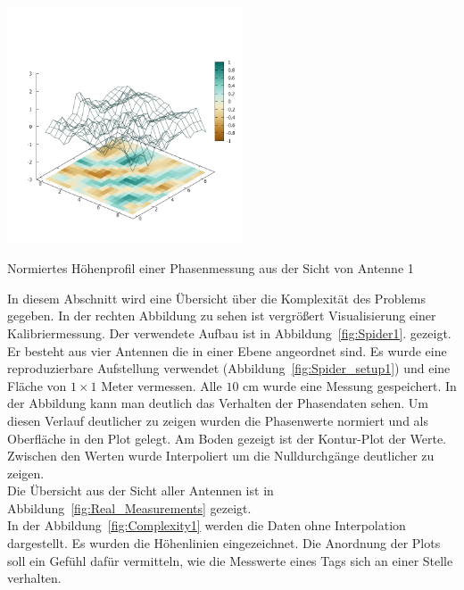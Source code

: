%
\begin{floatingfigure}[hr!]{6cm}
 \centering
         \includegraphics[width=7cm]{img/Plate0_A1.png}
         \caption[Profil einer Phasenmessung]{Normiertes Höhenprofil einer Phasenmessung aus der Sicht von Antenne 1 }
         \label{fig:Plate0_A1_}
\end{floatingfigure}
%
In diesem Abschnitt wird eine Übersicht über die Komplexität des Problems gegeben. In der rechten Abbildung zu sehen ist vergrößert Visualisierung einer Kalibriermessung. Der verwendete Aufbau ist in Abbildung~\ref{fig:Spider1}. gezeigt. Er besteht aus vier Antennen die in einer Ebene angeordnet sind. Es wurde eine reproduzierbare Aufstellung verwendet (Abbildung~\ref{fig:Spider_setup1}) und eine Fläche von $1\times1$ Meter vermessen. Alle $10$ cm wurde eine Messung gespeichert. In der Abbildung kann man deutlich das Verhalten der Phasendaten sehen. Um diesen Verlauf deutlicher zu zeigen wurden die Phasenwerte normiert und als Oberfläche in den Plot gelegt. Am Boden gezeigt ist der Kontur-Plot der Werte. Zwischen den Werten wurde Interpoliert um die Nulldurchgänge deutlicher zu zeigen.\\
%
Die Übersicht aus der Sicht aller Antennen ist in Abbildung~\ref{fig:Real_Measurements} gezeigt.\\
%
In der Abbildung~\ref{fig:Complexity1} werden die Daten ohne Interpolation dargestellt. Es wurden die Höhenlinien eingezeichnet. Die Anordnung der Plots soll ein Gefühl dafür vermitteln, wie die Messwerte eines Tags sich an einer Stelle verhalten.
%
